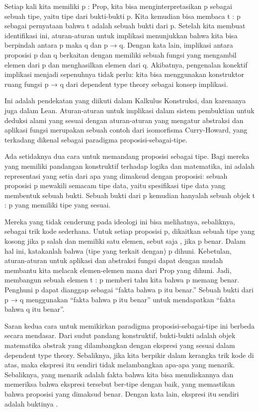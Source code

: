 Setiap kali kita memiliki p : Prop, kita bisa menginterpretasikan p sebagai sebuah tipe, yaitu tipe dari bukti-bukti p. Kita kemudian bisa membaca t : p sebagai pernyataan bahwa t adalah sebuah bukti dari p. Setelah kita membuat identifikasi ini, aturan-aturan untuk implikasi menunjukkan bahwa kita bisa berpindah antara p maka q dan p → q. Dengan kata lain, implikasi antara proposisi p dan q berkaitan dengan memiliki sebuah fungsi yang mengambil elemen dari p dan menghasilkan elemen dari q. Akibatnya, pengenalan konektif implikasi menjadi sepenuhnya tidak perlu: kita bisa menggunakan konstruktor ruang fungsi p → q dari dependent type theory sebagai konsep implikasi.

Ini adalah pendekatan yang diikuti dalam Kalkulus Konstruksi, dan karenanya juga dalam Lean. Aturan-aturan untuk implikasi dalam sistem pembuktian untuk deduksi alami yang sesuai dengan aturan-aturan yang mengatur abstraksi dan aplikasi fungsi merupakan sebuah contoh dari isomorfisma Curry-Howard, yang terkadang dikenal sebagai paradigma proposisi-sebagai-tipe.

Ada setidaknya dua cara untuk memandang proposisi sebagai tipe. Bagi mereka yang memiliki pandangan konstruktif terhadap logika dan matematika, ini adalah representasi yang setia dari apa yang dimaksud dengan proposisi: sebuah proposisi p mewakili semacam tipe data, yaitu spesifikasi tipe data yang membentuk sebuah bukti. Sebuah bukti dari p kemudian hanyalah sebuah objek t : p yang memiliki tipe yang sesuai.

Mereka yang tidak cenderung pada ideologi ini bisa melihatnya, sebaliknya, sebagai trik kode sederhana. Untuk setiap proposisi p, dikaitkan sebuah tipe yang kosong jika p salah dan memiliki satu elemen, sebut saja \*, jika p benar. Dalam hal ini, katakanlah bahwa (tipe yang terkait dengan) p dihuni. Kebetulan, aturan-aturan untuk aplikasi dan abstraksi fungsi dapat dengan mudah membantu kita melacak elemen-elemen mana dari Prop yang dihuni. Jadi, membangun sebuah elemen t : p memberi tahu kita bahwa p memang benar. Penghuni p dapat dianggap sebagai “fakta bahwa p itu benar.” Sebuah bukti dari p → q menggunakan “fakta bahwa p itu benar” untuk mendapatkan “fakta bahwa q itu benar”.

Saran kedua cara untuk memikirkan paradigma proposisi-sebagai-tipe ini berbeda secara mendasar. Dari sudut pandang konstruktif, bukti-bukti adalah objek matematika abstrak yang dilambangkan dengan ekspresi yang sesuai dalam dependent type theory. Sebaliknya, jika kita berpikir dalam kerangka trik kode di atas, maka ekspresi itu sendiri tidak melambangkan apa-apa yang menarik. Sebaliknya, yang menarik adalah fakta bahwa kita bisa menuliskannya dan memeriksa bahwa ekspresi tersebut ber-tipe dengan baik, yang memastikan bahwa proposisi yang dimaksud benar. Dengan kata lain, ekspresi itu sendiri adalah buktinya \citep{Avigad2024}.
